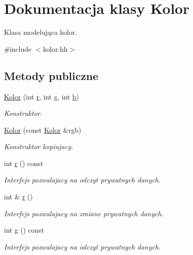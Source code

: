 \hypertarget{class_kolor}{\section{Dokumentacja klasy Kolor}
\label{class_kolor}
}


Klasa modelująca kolor.  




{\ttfamily \#include $<$kolor.\-hh$>$}

\subsection*{Metody publiczne}
\begin{DoxyCompactItemize}
\item 
\hyperlink{class_kolor_adde4f304856649a8a148288c271d4775}{Kolor} (int \hyperlink{class_kolor_a1091fbdb6e53516bfb68784e96e58bc1}{r}, int \hyperlink{class_kolor_a4dfa47458440fb136711fb6de6344f61}{g}, int \hyperlink{class_kolor_aa240903064a3d8f49585c34d92b74e5d}{b})
\begin{DoxyCompactList}\small\item\em Konstruktor. \end{DoxyCompactList}\item 
\hyperlink{class_kolor_a79baff3add17cc61abb8bc71f0a426e6}{Kolor} (const \hyperlink{class_kolor}{Kolor} \&rgb)
\begin{DoxyCompactList}\small\item\em Konstruktor kopiujacy. \end{DoxyCompactList}\item 
int \hyperlink{class_kolor_a1091fbdb6e53516bfb68784e96e58bc1}{r} () const 
\begin{DoxyCompactList}\small\item\em Interfejs pozwalajacy na odczyt prywatnych danych. \end{DoxyCompactList}\item 
int \& \hyperlink{class_kolor_a426240b4b7c4364e9d34db265475b4ad}{r} ()
\begin{DoxyCompactList}\small\item\em Interfejs pozwalajacy na zmiane prywatnych danych. \end{DoxyCompactList}\item 
int \hyperlink{class_kolor_a4dfa47458440fb136711fb6de6344f61}{g} () const 
\begin{DoxyCompactList}\small\item\em Interfejs pozwalajacy na odczyt prywatnych danych. \end{DoxyCompactList}\item 

\end{DoxyCompactItemize}
